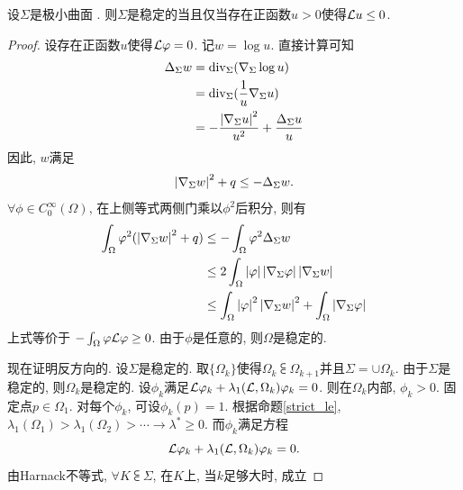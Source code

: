 \begin{proposition} \label{barta}
    设$\Sigma$是极小曲面 . 则$\Sigma $是稳定的当且仅当存在正函数$u>0$使得$\mathcal{L} u \le 0$.
\end{proposition}
\begin{proof}
    \par 设存在正函数$u$使得$\mathcal{L}\varphi=0$. 记$w=\log u $. 直接计算可知
    \begin{equation}
        \begin{split}
            \Delta_\Sigma w &={\text{div}}_\Sigma(\nabla_\Sigma \log u)\\
            &={\text{div}}_\Sigma(\frac{1}{u}\nabla_\Sigma u) \\
            &=-\frac{\left | \nabla_\Sigma u \right |^2}{u^2}+\frac{\Delta_\Sigma u}{u}
        \end{split}
    \end{equation}
    因此, $w$满足
    \begin{equation}
        \left | \nabla_\Sigma w \right |^2+q \le - \Delta_\Sigma w.
    \end{equation}
    $\forall \phi \in C^\infty_0(\Omega)$, 在上侧等式两侧门乘以$\phi^2$后积分, 则有
    \begin{equation}
        \begin{split}
            \int_\Omega \varphi^2(\left | \nabla_\Sigma w \right |^2+q) &\le -\int_\Omega \varphi^2 \Delta_\Sigma w\\
            &\le 2\int_\Omega \left | \varphi \right |\left | \nabla_\Sigma \varphi \right | \left | \nabla_\Sigma w \right |\\
            &\le \int_\Omega \left | \varphi \right |^2\left | \nabla_\Sigma w \right |^2 + \int_\Omega \left | \nabla_\Sigma \varphi \right |
        \end{split}
    \end{equation}
    上式等价于 $-\int_\Omega \varphi \mathcal{L} \varphi \ge 0$. 由于$\phi$是任意的, 则$\Omega$是稳定的.
    \par 现在证明反方向的.  设$\Sigma$是稳定的. 取$\{\Omega_k\}$使得$\Omega_{k} \subsub \Omega_{k+1}$并且$\Sigma = \cup \Omega_k$.  由于$\Sigma$是稳定的, 则$\Omega_k$是稳定的. 设$\phi_k$满足$\mathcal{L} \varphi_k +\lambda_1(\mathcal{L},\Omega_k)\varphi_k = 0$. 则在$\Omega_k$内部, $\phi_k>0$. 固定点$p \in \Omega_1$. 对每个$\phi_k$, 可设$\phi_k(p)=1$. 根据命题\eqref{strict_le}, $\lambda_1(\Omega_1) > \lambda_1(\Omega_2) > \cdots \to \lambda^* \ge 0$. 而$\phi_k$满足方程
    \begin{equation}
        \mathcal{L} \varphi_k + \lambda_1(\mathcal{L},\Omega_k) \varphi_k =0.
    \end{equation}
    由Harnack不等式, $\forall K \subsub \Sigma$, 在$K$上,  当$k$足够大时, 成立

\end{proof}
